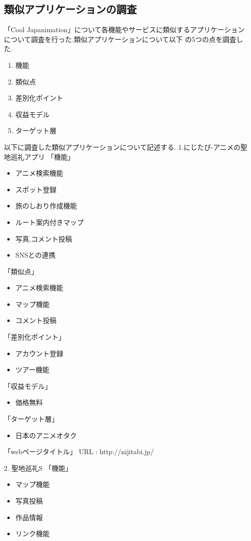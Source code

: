 \subsection{類似アプリケーションの調査}
\par
「Cool Japanimation」について各機能やサービスに類似するアプリケーションについて調査を行った.類似アプリケーションについて以下
の5つの点を調査した.
\begin{enumerate}
\item 機能
\item 類似点
\item 差別化ポイント
\item 収益モデル
\item ターゲット層
\end{enumerate}
\per
以下に調査した類似アプリケーションについて記述する.
\per
1.にじたび-アニメの聖地巡礼アプリ
「機能」
\begin{itemize}
\item アニメ検索機能
\item スポット登録
\item 旅のしおり作成機能
\item ルート案内付きマップ
\item 写真,コメント投稿
\item SNSとの連携
\end{itemize}
「類似点」
\begin{itemize}
\item アニメ検索機能
\item マップ機能
\item コメント投稿
\end{itemize}
「差別化ポイント」
\begin{itemize}
\item アカウント登録
\item ツアー機能
\end{itemize}
「収益モデル」
\begin{itemize}
\item 価格無料
\end{itemize}
「ターゲット層」
\begin{itemize}
\item 日本のアニメオタク
\end{itemize}
「webページタイトル」
URL : http://nijitabi.jp/
\par 
2. 聖地巡礼S
「機能」
\begin{itemize}
\item マップ機能
\item 写真投稿
\item 作品情報
\item リンク機能
\end{itemize}
